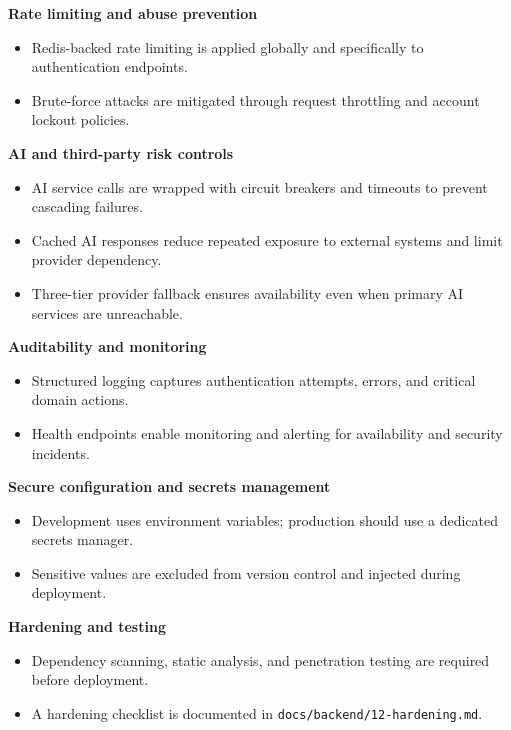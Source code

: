 \textbf{Rate limiting and abuse prevention}

\begin{itemize}
    \item Redis-backed rate limiting is applied globally and specifically to authentication endpoints.
    \item Brute-force attacks are mitigated through request throttling and account lockout policies.
\end{itemize}

\textbf{AI and third-party risk controls}

\begin{itemize}
    \item AI service calls are wrapped with circuit breakers and timeouts to prevent cascading failures.
    \item Cached AI responses reduce repeated exposure to external systems and limit provider dependency.
    \item Three-tier provider fallback ensures availability even when primary AI services are unreachable.
\end{itemize}

\textbf{Auditability and monitoring}

\begin{itemize}
    \item Structured logging captures authentication attempts, errors, and critical domain actions.
    \item Health endpoints enable monitoring and alerting for availability and security incidents.
\end{itemize}

\textbf{Secure configuration and secrets management}

\begin{itemize}
    \item Development uses environment variables; production should use a dedicated secrets manager.
    \item Sensitive values are excluded from version control and injected during deployment.
\end{itemize}

\textbf{Hardening and testing}

\begin{itemize}
    \item Dependency scanning, static analysis, and penetration testing are required before deployment.
    \item A hardening checklist is documented in \texttt{docs/backend/12-hardening.md}.
\end{itemize}

